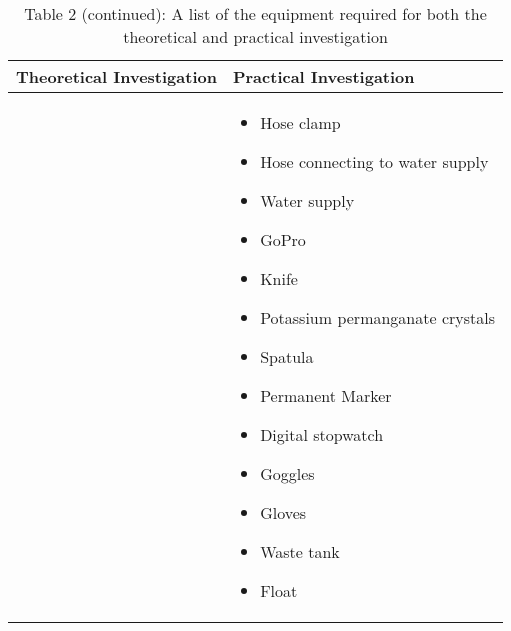 \begin{table}[H]
	\centering
	\begin{tabularx}{\textwidth}{|X|X|}
		\hline
		\textbf{Theoretical Investigation} & \textbf{Practical Investigation} \\
		\hline
		&
		\begin{itemize}[leftmargin=1.5em, itemsep=2pt, topsep=0pt, label=--]
			
			\item Hose clamp
			\item Hose connecting to water supply
			\item Water supply
			\item GoPro
			\item Knife
			\item Potassium permanganate crystals
			\item Spatula
			\item Permanent Marker
			\item Digital stopwatch
			\item Goggles
			\item Gloves
			\item Waste tank
			\item Float
		\end{itemize} \\
		\hline
	\end{tabularx}
	\caption*{Table 2 (continued): A list of the equipment required for both the theoretical and practical investigation}
	\label{tab:equipmentList2}
\end{table}
